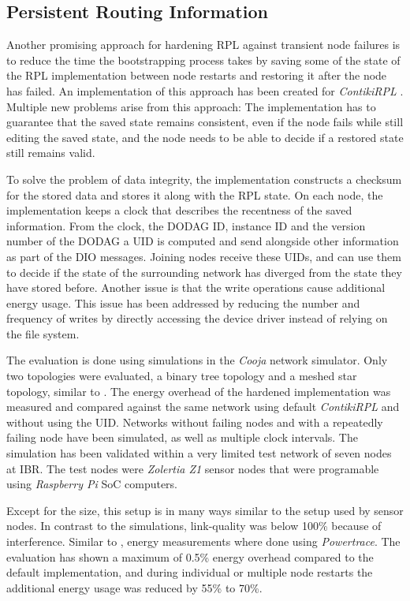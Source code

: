 \subsection{Persistent Routing Information}

Another promising approach for hardening \ac{RPL} against transient node failures is to reduce the time the bootstrapping process takes by saving some of the state of the \ac{RPL} implementation between node restarts and restoring it after the node has failed.
An implementation of this approach has been created for \emph{Contiki\ac{RPL}} \cite{mueller2017}.
Multiple new problems arise from this approach: The implementation has to guarantee that the saved state remains consistent, even if the node fails while still editing the saved state, and the node needs to be able to decide if a restored state still remains valid.

To solve the problem of data integrity, the implementation constructs a checksum for the stored data and stores it along with the \ac{RPL} state.
On each node, the implementation keeps a clock that describes the recentness of the saved information.
From the clock, the \ac{DODAG} ID, instance ID and the version number of the \ac{DODAG} a \ac{UID} is computed and send alongside other information as part of the \ac{DIO} messages.
Joining nodes receive these \acp{UID}, and can use them to decide if the state of the surrounding network has diverged from the state they have stored before.
Another issue is that the write operations cause additional energy usage.
This issue has been addressed by reducing the number and frequency of writes by directly accessing the device driver instead of relying on the file system.

The evaluation is done using simulations in the \emph{Cooja} network simulator.
Only two topologies were evaluated, a binary tree topology and a meshed star topology, similar to \cite{kulau2017energy}.
The energy overhead of the hardened implementation was measured and compared against the same network using default \emph{Contiki\ac{RPL}} and without using the UID.
Networks without failing nodes and with a repeatedly failing node have been simulated, as well as multiple clock intervals.
The simulation has been validated within a very limited test network of seven nodes at \ac{IBR}.
The test nodes were \emph{Zolertia Z1} sensor nodes that were programable using \emph{Raspberry Pi} \ac{SoC} computers.

Except for the size, this setup is in many ways similar to the setup used by \fitlab sensor nodes.
In contrast to the simulations, link-quality was below 100\% because of interference.
Similar to \cite{ali2012performance}, energy measurements where done using \emph{Powertrace}.
The evaluation has shown a maximum of 0.5\% energy overhead compared to the default implementation, and during individual or multiple node restarts the additional energy usage was reduced by 55\% to 70\%.